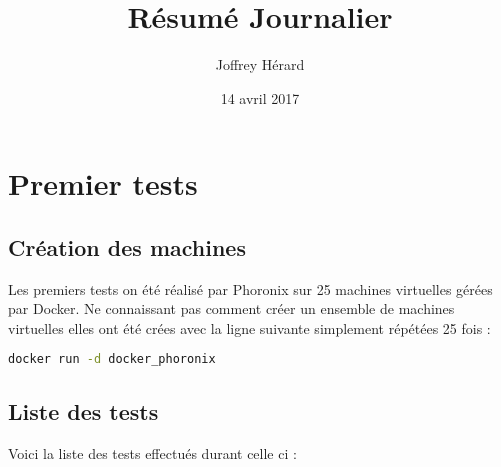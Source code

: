 \documentclass[french]{article}
\begin{document}
\title{Résumé Journalier}
\author{Joffrey Hérard}
\date{14 avril 2017} 

\maketitle
\section{Premier tests}
\subsection{Création des machines}
Les premiers tests on été réalisé par Phoronix sur 25 machines virtuelles gérées par Docker. Ne connaissant pas comment créer un ensemble de machines virtuelles elles ont été crées avec la ligne suivante simplement répétées 25 fois : 

\begin{lstlisting}[language=bash,caption={dmesg},frame=single]
docker run -d docker_phoronix
\end{lstlisting}

\subsection{Liste des tests}
Voici la liste des tests effectués durant celle ci : 
\newpage
\end{document}
